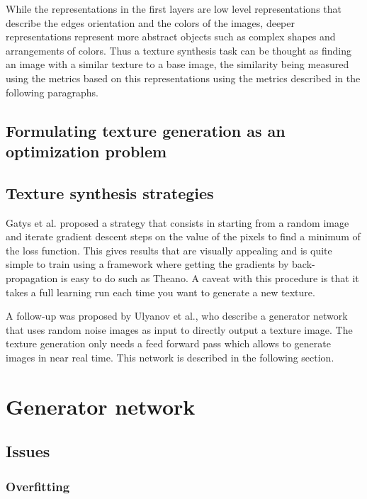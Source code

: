 \documentclass{article}
\begin{document}
While the representations in the first layers are low level representations that describe the edges orientation and the colors of the images, deeper representations represent more abstract objects such as complex shapes and arrangements of colors. Thus a texture synthesis task can be thought as finding an image with a similar texture to a base image, the similarity being measured using the metrics based on this representations using the metrics described in the following paragraphs.

\subsection{Formulating texture generation as an optimization problem}



\subsection{Texture synthesis strategies}

Gatys et al. proposed a strategy that consists in starting from a random image and iterate gradient descent steps on the value of the pixels to find a minimum of the loss function. This gives results that are visually appealing and is quite simple to train using a framework where getting the gradients by back-propagation is easy to do such as Theano. A caveat with this procedure is that it takes a full learning run each time you want to generate a new texture.

A follow-up was proposed by Ulyanov et al., who describe a generator network that uses random noise images as input to directly output a texture image. The texture generation only needs a feed forward pass which allows to generate images in near real time. This network is described in the following section.



\section{Generator network}

\subsection{Issues}
\subsubsection{Overfitting}
\end{document}
